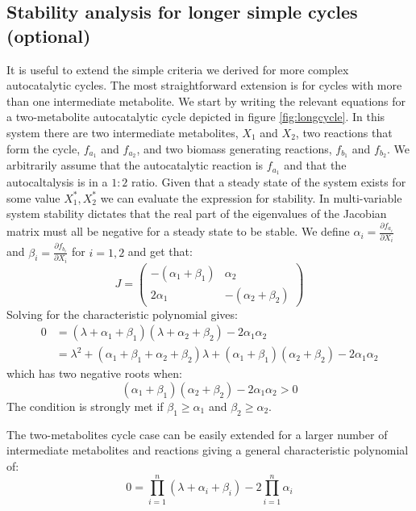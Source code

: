 \documentclass[a4page,notitlepage]{article}
\begin{document}
    \subsection{Stability analysis for longer simple cycles (optional)}
    It is useful to extend the simple criteria we derived for more complex autocatalytic cycles.
    The most straightforward extension is for cycles with more than one intermediate metabolite.
    We start by writing the relevant equations for a two-metabolite autocatalytic cycle depicted in figure \ref{fig:longcycle}.
    In this system there are two intermediate metabolites, $X_1$ and $X_2$, two reactions that form the cycle, $f_{a_1}$ and $f_{a_2}$, and two biomass generating reactions, $f_{b_1}$ and $f_{b_2}$.
    We arbitrarily assume that the autocatalytic reaction is $f_{a_1}$ and that the autocaltalysis is in a $1:2$ ratio.
    Given that a steady state of the system exists for some value $X_1^*,X_2^*$ we can evaluate the expression for stability.
    In multi-variable system stability dictates that the real part of the eigenvalues of the Jacobian matrix must all be negative for a steady state to be stable.
    We define $\alpha_i=\frac{\partial f_{a_i}}{\partial X_i}$ and $\beta_i=\frac{\partial f_{b_i}}{\partial X_i}$ for $i=1,2$ and get that:
    \begin{equation*}
        J=
        \begin{pmatrix}
            -(\alpha_1+\beta_1) & \alpha_2 \\
            2\alpha_1 & -(\alpha_2+\beta_2)
        \end{pmatrix}
    \end{equation*}
    Solving for the characteristic polynomial gives:
    \begin{align}
        0 & =(\lambda+\alpha_1+\beta_1)(\lambda+\alpha_2+\beta_2)-2\alpha_1\alpha_2 \\
        & = \lambda^2+(\alpha_1+\beta_1+\alpha_2+\beta_2)\lambda+(\alpha_1+\beta_1)(\alpha_2+\beta_2)-2\alpha_1\alpha_2
    \end{align}
    which has two negative roots when:
    \begin{equation}
        (\alpha_1+\beta_1)(\alpha_2+\beta_2)-2\alpha_1\alpha_2>0
    \end{equation}
    The condition is strongly met if $\beta_1\geq \alpha_1$ and $\beta_2\geq\alpha_2$.
    
    The two-metabolites cycle case can be easily extended for a larger number of intermediate metabolites and reactions giving a general characteristic polynomial of:
    \begin{equation}
        0=\prod_{i=1}^n(\lambda+\alpha_i+\beta_i)-2\prod_{i=1}^n\alpha_i
    \end{equation}
\end{document}
